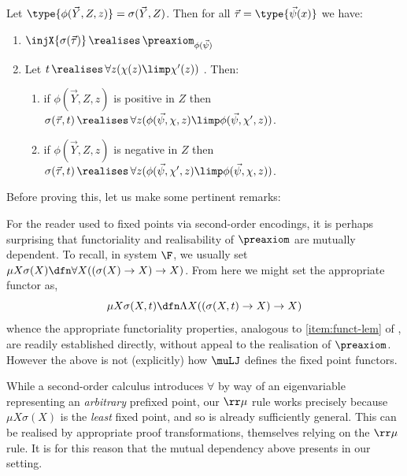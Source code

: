 \begin{lemma}
    \label{lem:funct-and-pre-realisation}
    Let $\type{\phi(\vec Y,Z,z)} = \sigma(\vec Y,Z)$.
    Then for all $\vec \tau = \type{\vec \psi(x)}$ we have:
    \begin{enumerate}
        \item\label{item:in-realises-pre} $\injX{\sigma(\vec \tau)} \, \realises\, \preaxiom_{\phi(\vec \psi)} $
        \item\label{item:funct-lem} Let $t \, \realises\, \forall z (\chi(z) \limp \chi'(z))$ . Then:
        \begin{enumerate}
            \item\label{item:funct-lem-pos} if $\phi(\vec Y,Z,z)$ is positive in $Z$ then $\sigma(\vec \tau,t)\, \realises\, \forall z (\phi(\vec \psi,\chi,z) \limp \phi (\vec\psi , \chi',z))$.
            \item\label{item:funct-lem-neg}
            if $\phi(\vec Y,Z,z)$ is negative in $Z$ then $\sigma(\vec \tau,t)\, \realises\, \forall z (\phi(\vec \psi,\chi',z) \limp \phi (\vec\psi , \chi,z))$.
        \end{enumerate}
    \end{enumerate}
\end{lemma}

Before proving this, let us make some pertinent remarks:
\begin{remark}
    [Comparison to $\F$]
    For the reader used to fixed points via second-order encodings, it is perhaps surprising that functoriality and realisability of $\preaxiom$ are mutually dependent. 
    To recall, in system $\F$, we usually set $\mu X\sigma(X) \dfn \forall X ((\sigma(X) \to X) \to X)$. 
    From here we might set the appropriate functor as,
    \[
        \mu X \sigma(X,t) \dfn \Lambda X ((\sigma(X,t)\to X)\to X)
    \]
    whence the appropriate functoriality properties, analogous to \eqref{item:funct-lem} of , are readily established directly, without appeal to the realisation of $\preaxiom$.
    However the above is not (explicitly) how $\muLJ$ defines the fixed point functors.
    
    While a second-order calculus introduces $\forall$ by way of an eigenvariable representing an \emph{arbitrary} prefixed point, our $\rr\mu$ rule works precisely because $\mu X\sigma(X)$ is the \emph{least} fixed point, and so is already sufficiently general.
    This can be realised by appropriate proof transformations, themselves relying on the $\rr\mu$ rule.
    It is for this reason that the mutual dependency above presents in our setting.
\end{remark}


